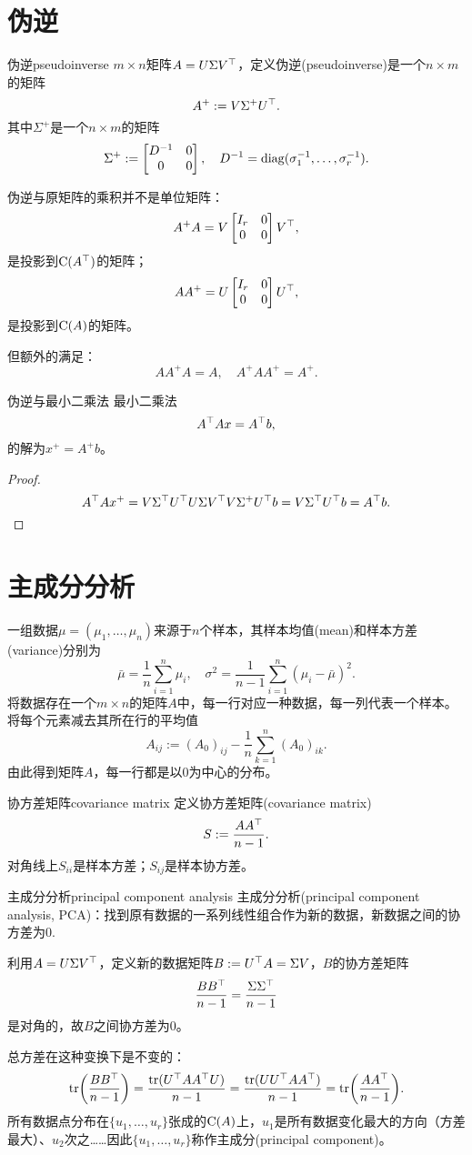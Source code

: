 \section{伪逆}
\begin{definition}{伪逆}{pseudoinverse}
	$m\times n$矩阵$A=U\Sigma V^\top$，定义伪逆(pseudoinverse)是一个$n\times m$的矩阵
	\begin{equation}
		A^+:=V\Sigma^+U^\top.
	\end{equation}
	其中$\Sigma^+$是一个$n\times m$的矩阵
	\[
		\Sigma^+:=\begin{bmatrix}
			D^{-1}&0\\0&0
		\end{bmatrix},\quad D^{-1}=\operatorname{diag}(\sigma_1^{-1},\ldots,\sigma_r^{-1}).
	\]
\end{definition}
\begin{remark}
	伪逆与原矩阵的乘积并不是单位矩阵：
	\[
		A^+A=V\begin{bmatrix}
			I_r&0\\0&0
		\end{bmatrix}V^\top,
	\]
	是投影到$\operatorname{C}(A^\top)$的矩阵；
	\[
		AA^+=U\begin{bmatrix}
			I_r&0\\0&0
		\end{bmatrix}U^\top,
	\]
	是投影到$\operatorname{C}(A)$的矩阵。
	
	但额外的满足：
	\[
		AA^+A=A,\quad A^+AA^+=A^+.
	\]
\end{remark}
\begin{theorem}{伪逆与最小二乘法}{}
	最小二乘法
	\[
		A^\top Ax=A^\top b,
	\]
	的解为$x^+=A^+b$。
\end{theorem}
\begin{proof}
	\[
		A^\top Ax^+=V\Sigma^\top U^\top U\Sigma V^\top V\Sigma^+U^\top b=V\Sigma^\top U^\top b=A^\top b.
		\qedhere
	\]
\end{proof}
\section{主成分分析}
一组数据$\mu=(\mu_1,\ldots,\mu_n)$来源于$n$个样本，其样本均值(mean)和样本方差(variance)分别为
\[
	\bar\mu=\frac1n\sum_{i=1}^n\mu_i,\quad\sigma^2=\frac1{n-1}\sum_{i=1}^n(\mu_i-\bar\mu)^2.
\]
将数据存在一个$m\times n$的矩阵$A$中，每一行对应一种数据，每一列代表一个样本。将每个元素减去其所在行的平均值
\[
	A_{ij}:=(A_0)_{ij}-\frac1n\sum_{k=1}^n(A_0)_{ik}.
\]
由此得到矩阵$A$，每一行都是以0为中心的分布。
\begin{definition}{协方差矩阵}{covariance matrix}
	定义协方差矩阵(covariance matrix)
	\begin{equation}
		S:=\frac{AA^\top}{n-1}.
	\end{equation}
	对角线上$S_{ii}$是样本方差；$S_{ij}$是样本协方差。
\end{definition}
\begin{method}{主成分分析}{principal component analysis}
	主成分分析(principal component analysis, PCA)：找到原有数据的一系列线性组合作为新的数据，新数据之间的协方差为0.
\end{method}
利用$A=U\Sigma V^\top$，定义新的数据矩阵$B:=U^\top A=\Sigma V$，$B$的协方差矩阵
\[
	\frac{BB^\top}{n-1}=\frac{\Sigma\Sigma^\top}{n-1}
\]
是对角的，故$B$之间协方差为0。

总方差在这种变换下是不变的：
\[
	\operatorname{tr}\biggl(\frac{BB^\top}{n-1}\biggr)=\frac{\operatorname{tr}(U^\top AA^\top U)}{n-1}=\frac{\operatorname{tr}(UU^\top AA^\top)}{n-1}=\operatorname{tr}\biggl(\frac{AA^\top}{n-1}\biggr).
\]
所有数据点分布在$\{u_1,\ldots,u_r\}$张成的$\operatorname{C}(A)$上，$u_1$是所有数据变化最大的方向（方差最大）、$u_2$次之……因此$\{u_1,\ldots,u_r\}$称作主成分(principal component)。
